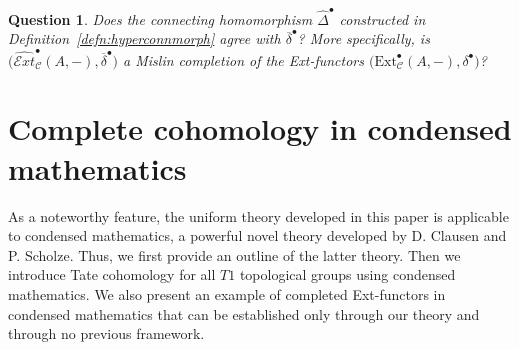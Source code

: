 \documentclass[12pt,a4paper]{article}
\numberwithin{equation}{section}
\newtheorem{ques}[thm]{Question}
\theoremstyle{nonumberplain}
\begin{document}
\begin{ques}\label{ques:comparewithguoliang}
Does the connecting homomorphism $\widehat{\Delta}^{\bullet}$ constructed in Definition~\ref{defn:hyperconnmorph} agree with $\overline{\delta}^{\bullet}$? More specifically, is $\big(\widehat{\mathcal{E}xt}_{\mathcal{C}}^{\bullet}(A, -), \overline{\delta}^{\bullet}\big)$ a Mislin completion of the Ext-functors $\big(\mathrm{Ext}_{\mathcal{C}}^{\bullet}(A, -), \delta^{\bullet}\big)$?
\end{ques}

\section{Complete cohomology in condensed mathematics}\label{sec:condmaths}

As a noteworthy feature, the uniform theory developed in this paper is applicable to condensed mathematics, a powerful novel theory developed by D.\! Clausen and P.\! Scholze. Thus, we first provide an outline of the latter theory. Then we introduce Tate cohomology for all $T1$ topological groups using condensed mathematics. We also present an example of completed Ext-functors in condensed mathematics that can be established only through our theory and through no previous framework. \\
\end{document}
